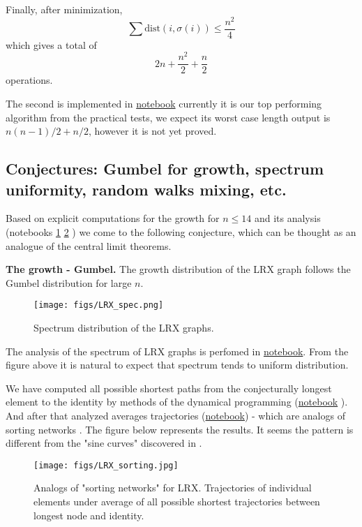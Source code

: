 \documentclass[atmp]{ipart_v1}
\numberwithin{equation}{section}
\theoremstyle{plain}%
\begin{document}
Finally, after minimization,
\[
\sum \text{dist}(i, \sigma(i)) \leq \frac{n^2}{4}
\]
which gives a total of  
\[
2n + \frac{n^2}{2} + \frac{n}{2}
\]
operations.




The second is implemented in \href{https://www.kaggle.com/code/luxoove/top1-lrx-inversions-based-algorithm}{notebook} currently it is our top performing algorithm from the practical tests, we expect its worst case length output is $n(n-1)/2+n/2$, however it is not yet proved.


\subsection{Conjectures: Gumbel for growth, spectrum uniformity, random walks mixing, etc. }

Based on explicit computations for the growth for $n \le 14$ and its analysis (notebooks \href{https://www.kaggle.com/code/ogurtsov/gumbel}{1} \href{https://www.kaggle.com/code/ogurtsov/gumbel-for-binary-puzzle}{2} ) we come to the following conjecture, which can be thought as an analogue of the central limit theorems. 

{\bf The growth - Gumbel.} The growth distribution of the LRX graph follows the Gumbel distribution for large $n$.

\begin{figure}[h!]
   \centering
   \texttt{[image: figs/LRX\_spec.png]}
   \caption{Spectrum distribution of the LRX graphs. }\label{fig:LRX-spec}
\end{figure}

The analysis of the spectrum of LRX graphs is perfomed in \href{https://www.kaggle.com/code/nikolenkosergei/spectrum-analysis}{notebook}. From the figure above it is natural to expect that spectrum tends to uniform distribution.

We have computed all possible shortest paths from the conjecturally longest element to the identity by methods of the dynamical programming (\href{}{notebook} ). And after that analyzed averages trajectories (\href{https://www.kaggle.com/code/antoninadolgorukova/lrx-sorting-networks}{notebook}) - which are analogs of sorting networks \cite{angel2007random}. The figure below represents the results. It seems the pattern is different from the "sine curves" discovered in \cite{angel2007random}. 

\begin{figure}[h!]
   \centering
   \texttt{[image: figs/LRX\_sorting.jpg]}
   \caption{Analogs of "sorting networks" for LRX. Trajectories of individual elements under average of all possible shortest trajectories between longest node and identity. }\label{fig:LRX-sort}
\end{figure}
\end{document}
